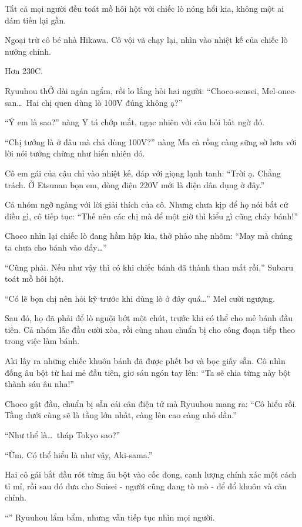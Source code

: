 \documentclass[../main.tex]{subfiles}
\begin{document}
Tất cả mọi người đều toát mồ hôi hột với chiếc lò nóng hổi kia, không một ai dám tiến lại gần.

Ngoại trừ cô bé nhà Hikawa. Cô vội vã chạy lại, nhìn vào nhiệt kế của chiếc lò nướng chính.

Hơn 230\degree C.

Ryuuhou thỞ dài ngán ngẩm, rồi lo lắng hỏi hai người: ``Choco-sensei, Mel-onee-san\dots\ Hai chị quen dùng lò 100V đúng không ạ?''

``Ý em là sao?'' nàng Y tá chớp mắt, ngạc nhiên với câu hỏi bất ngờ đó.

``Chị tưởng là ở đâu mà chả dùng 100V?'' nàng Ma cà rồng càng sững sờ hơn với lời nói tưởng chừng như hiển nhiên đó.

Cô em gái của cậu chỉ vào nhiệt kế, đáp với giọng lạnh tanh: ``Trời ạ. Chẳng trách. Ở Etsunan bọn em, dòng điện 220V mới là điện dân dụng ở đây.''

Cả nhóm ngỡ ngàng với lời giải thích của cô. Nhưng chưa kịp để họ nói bất cứ điều gì, cô tiếp tục: ``Thế nên các chị mà để một giờ thì kiểu gì cũng cháy bánh!''

Choco nhìn lại chiếc lò đang hầm hập kia, thở phào nhẹ nhõm: ``May mà chúng ta chưa cho bánh vào đấy\dots''

``Cũng phải. Nếu như vậy thì có khi chiếc bánh đã thành than mất rồi,'' Subaru toát mồ hôi hột.

``Có lẽ bọn chị nên hỏi kỹ trước khi dùng lò ở đây quá\dots'' Mel cười ngượng.

Sau đó, họ đã phải để lò nguội bớt một chút, trước khi có thể cho mẻ bánh đầu tiên. Cả nhóm lắc đầu cười xòa, rồi cùng nhau chuẩn bị cho công đoạn tiếp theo trong việc làm bánh.

\ct

Aki lấy ra những chiếc khuôn bánh đã được phết bơ và bọc giấy sẵn. Cô nhìn đống âu bột từ hai mẻ đầu tiên, giơ sáu ngón tay lên: ``Ta sẽ chia từng này bột thành sáu âu nha!''

Choco gật đầu, chuẩn bị sẵn cái cân điện tử mà Ryuuhou mang ra: ``Cô hiểu rồi. Tầng dưới cùng sẽ là tầng lớn nhất, càng lên cao càng nhỏ dần.''

``Như thể là\dots\ tháp Tokyo sao?''

``Ừm. Có thể hiểu là như vậy, Aki-sama.''

Hai cô gái bắt đầu rót từng âu bột vào cốc đong, canh lượng chính xác một cách tỉ mỉ, rồi sau đó đưa cho Suisei - người cũng đang tò mò - để đổ khuôn và căn chỉnh.

``\textit{}'' Ryuuhou lẩm bẩm, nhưng vẫn tiếp tục nhìn mọi người.
\end{document}
